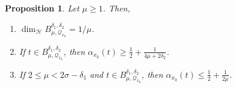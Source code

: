 \documentclass[11pt,reqno]{amsart}
\newtheorem{prop}[thm]{Proposition}
\theoremstyle{definition}
\begin{document}
\begin{prop} \label{thm:Holder_Regularity_For_Irrationals}
Let $\mu \geq 1$. Then, 
\begin{enumerate}
	\item [(a)] $\operatorname{dim}_{\mathcal H} B^{\delta_1, \delta_2}_{\mu, \mathcal Q_{x_0}} = 1/\mu$. 
	\item [(b)] If $t \in B^{\delta_1, \delta_2}_{\mu, \mathcal Q_{x_0}}$, then $\alpha_{x_0}(t) \geq \frac12 + \frac{1}{4\mu + 2\delta_2}$. 

	\item[(c)] If $2 \leq \mu < 2\sigma - \delta_1$ and  $t \in B^{\delta_1, \delta_2}_{\mu, \mathcal Q_{x_0}}$, then $\alpha_{x_0}(t) \leq \frac12 + \frac{1}{2\mu}$.
\end{enumerate}
\end{prop}
\end{document}
